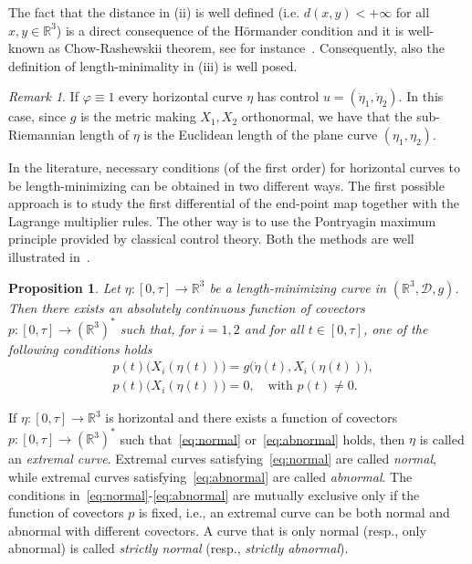 \documentclass[12pt]{amsart}
\theoremstyle{plain}
\newtheorem {proposition} [theorem]{Proposition}
\theoremstyle{definition}
\theoremstyle{remark}
\newtheorem{remark}[theorem]{Remark}
\numberwithin{equation}{section}
\newcommand{\R}{\mathbb{R}}
\newcommand{\D}{\mathcal{D}}
\newcommand{\oo}{\infty}
\newcommand{\<}{\langle}
\renewcommand{\>}{\rangle}
\newcommand{\0}{\theta}
\newcommand{\1}{{-1}}
\renewcommand{\=}{\coloneqq}
\renewcommand{\.}{\dots}
\renewcommand{\-}{\cdot}
\renewcommand{\:}{\,:\,}
\theoremstyle{definition}
\begin{document}
The fact that the distance in (ii) is well defined (i.e. $d(x,y)<+\oo$ for all $x,y\in\R^3$) is a direct consequence of the H\"ormander condition and it is well-known as Chow-Rashewskii theorem, see for instance~\cite{ABB20}. Consequently, also the definition of length-minimality in (iii) is well posed. 

\begin{remark}
	\label{rem:eucl}
	If $\varphi\equiv1$ every horizontal curve $\eta$ has control $u=(\dot\eta_1,\dot\eta_2)$. In this case, since $g$ is the metric making $X_1,X_2$ orthonormal, we have that the sub-Riemannian length of $\eta$ is the Euclidean length of the plane curve $(\eta_1,\eta_2)$.
\end{remark}
	
In the literature, necessary conditions (of the first order) for horizontal curves to be length-minimizing can be obtained in two different ways. The first possible approach is to study the first differential of the end-point map together with the Lagrange multiplier rules. The other way is to use the Pontryagin maximum principle provided by classical control theory. Both the methods are well illustrated in~\cite{ABB20, AgrSac}.
	
\begin{proposition}
	\label{prop:PMP}
	Let $\eta:[0,\tau]\to\R^3$ be a length-minimizing curve in $(\R^3,\D,g)$. Then there exists an absolutely continuous function of covectors $p:[0,\tau]\to(\R^3)^*$ such that, for $i=1,2$ and for all $t\in[0,\tau]$, one of the following conditions holds
	\begin{align}
		&\label{eq:normal} p(t)\big(X_i(\eta(t))\big)=g\big(\dot\eta(t),X_i(\eta(t))\big),\\
		&\label{eq:abnormal}p(t)\big(X_i(\eta(t))\big)=0, \quad \text{with } p(t)\neq0.
	\end{align}
\end{proposition}

If $\eta:[0,\tau]\to\R^3$ is horizontal and there exists a function of covectors $p:[0,\tau]\to(\R^3)^*$ such that~\eqref{eq:normal} or~\eqref{eq:abnormal} holds, then $\eta$ is called an {\em extremal curve}. Extremal curves satisfying~\eqref{eq:normal} are called {\em normal}, while extremal curves satisfying~\eqref{eq:abnormal} are called {\em abnormal}. The conditions in~\eqref{eq:normal}-\eqref{eq:abnormal} are mutually exclusive only if the function of covectors $p$ is fixed, i.e., an extremal curve can be both normal and abnormal with different covectors. A curve that is only normal (resp., only abnormal) is called {\em strictly normal} (resp., {\em strictly abnormal}). 
\end{document}
